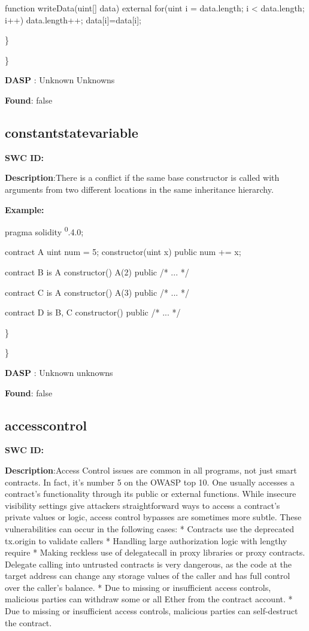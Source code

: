 \documentclass{article}
\begin{document}
{{{    function writeData(uint[] \textunderscore data) external {
        for(uint i = data.length; i < \textunderscore data.length; i++) {
            data.length++;
            data[i]=\textunderscore data[i];
        }
    }
}

\} 

\} 

\textbf{DASP} : Unknown Unknowns

\textbf{Found}: false

\subsection{constant\textunderscore state\textunderscore variable} 
\textbf{SWC \textunderscore ID:} 

\textbf{Description}:There is a conflict if the same base constructor is called with arguments from two different locations in the same inheritance hierarchy.


\textbf{Example:} 

pragma solidity \textsuperscript0.4.0;

contract A{
    uint num = 5;
    constructor(uint x) public{
        num += x;
    }
}

contract B is A{
    constructor() A(2) public { /* ... */ }
}

contract C is A {
    constructor() A(3) public { /* ... */ }
}

contract D is B, C {
    constructor() public { /* ... */ }
}

\} 

\} 

\textbf{DASP} : Unknown unknowns

\textbf{Found}: false

\subsection{access\textunderscore control} 
\textbf{SWC \textunderscore ID:} 

\textbf{Description}:Access Control issues are common in all programs, not just smart contracts. In fact, it's number 5 on the OWASP top 10. One usually accesses a contract's functionality through its public or external functions. While insecure visibility settings give attackers straightforward ways to access a contract's private values or logic, access control bypasses are sometimes more subtle. These vulnerabilities can occur in the following cases:
* Contracts use the deprecated tx.origin to validate callers
* Handling large authorization logic with lengthy require
* Making reckless use of delegatecall in proxy libraries or proxy contracts. Delegate calling into untrusted contracts is very dangerous, as the code at the target address can change any storage values of the caller and has full control over the caller's balance.
* Due to missing or insufficient access controls, malicious parties can withdraw some or all Ether from the contract account.
* Due to missing or insufficient access controls, malicious parties can self-destruct the contract.


}}
\end{document}
